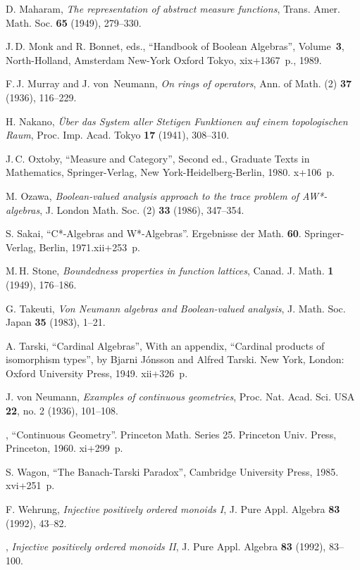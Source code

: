 \documentclass[psamsfonts,reqno]{memo-l}
\theoremstyle{plain}
\theoremstyle{definition}
\theoremstyle{remark}
\numberwithin{equation}{section}
\begin{document}
\begin{thebibliography}{99}
D. Maharam,
\emph{The representation of abstract measure functions},
Trans. Amer. Math. Soc. \textbf{65} (1949), 279--330.

J.\,D. Monk and R. Bonnet, eds.,
``Handbook of Boolean Algebras'',
Volume~\textbf{3}, North-Holland, Amsterdam New-York Oxford
Tokyo, xix+1367~p., 1989.

F.\,J. Murray and J. von~Neumann,
\emph{On rings of operators}, Ann. of Math. (2) \textbf{37} (1936),
116--229.

H. Nakano,
\emph{\"Uber das System aller Stetigen Funktionen auf einem topologischen
Raum}, Proc. Imp. Acad. Tokyo \textbf{17} (1941), 308--310.

J.\,C. Oxtoby,
``Measure and Category'', Second ed., Graduate Texts in Mathematics,
Springer-Verlag, New York-Heidelberg-Berlin, 1980. x+106~p.

M. Ozawa,
\emph{Boolean-valued analysis approach to the trace problem of AW*-algebras},
J. London Math. Soc. (2) \textbf{33} (1986), 347--354.

S. Sakai,
``C*-Algebras and W*-Algebras''.
Ergebnisse der Math. \textbf{60}. Springer-Verlag, Berlin, 1971.xii+253~p.

M.\,H. Stone,
\emph{Boundedness properties in function lattices},
Canad. J. Math. \textbf{1} (1949), 176--186.

G. Takeuti,
\emph{Von Neumann algebras and Boolean-valued analysis},
J. Math. Soc. Japan \textbf{35} (1983), 1--21.

A. Tarski,
``Cardinal Algebras'', With an appendix, ``Cardinal products of isomorphism
types'', by Bjarni J\'onsson and Alfred Tarski.
New York, London: Oxford University Press, 1949. xii+326~p.

J. von Neumann,
\emph{Examples of continuous geometries}, Proc. Nat. Acad. Sci.
USA {\bf 22}, no. 2 (1936), 101--108.

\bysame,
``Continuous Geometry''. Princeton Math. Series 25. Princeton
Univ. Press, Princeton, 1960. xi+299~p.

S. Wagon,
``The Banach-Tarski Paradox'', Cambridge University Press, 1985.
xvi+251~p.

F. Wehrung,
\emph{Injective positively ordered monoids I},
J. Pure Appl. Algebra \textbf{83} (1992), 43--82.

\bysame,
\emph{Injective positively ordered monoids II},
J. Pure Appl. Algebra \textbf{83} (1992), 83--100.


\end{thebibliography}
\end{document}
